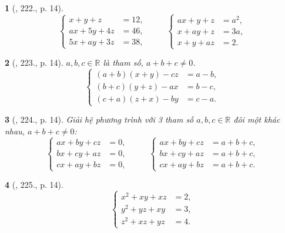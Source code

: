 \documentclass{article}
\newtheorem{baitoan}{}
\begin{document}
\begin{baitoan}[\cite{Binh_Toan_9_tap_2}, 222., p. 14]
	\begin{equation*}
		\left\{\begin{split}
			x + y + z &= 12,\\
			ax + 5y + 4z &= 46,\\
			5x + ay + 3z &= 38,
		\end{split}\right.\hspace{1cm}\left\{\begin{split}
			ax + y + z &= a^2,\\
			x + ay + z &= 3a,\\
			x + y + az &= 2.
		\end{split}\right.
	\end{equation*}
\end{baitoan}

\begin{baitoan}[\cite{Binh_Toan_9_tap_2}, 223., p. 14]
	$a,b,c\in\mathbb{R}$ là tham số, $a + b + c\ne0$.
	\begin{equation*}
		\left\{\begin{split}
			(a + b)(x + y) - cz &= a - b,\\
			(b + c)(y + z) - ax &= b - c,\\
			(c + a)(z + x) - by &= c - a.
		\end{split}\right.
	\end{equation*}
\end{baitoan}

\begin{baitoan}[\cite{Binh_Toan_9_tap_2}, 224., p. 14]
	Giải hệ phương trình với 3 tham số $a,b,c\in\mathbb{R}$ đôi một khác nhau, $a + b + c\ne0$:
	\begin{equation*}
		\left\{\begin{split}
			ax + by + cz &= 0,\\
			bx + cy + az &= 0,\\
			cx + ay + bz &= 0,
		\end{split}\right.\hspace{1cm}\left\{\begin{split}
			ax + by + cz &= a + b + c,\\
			bx + cy + az &= a + b + c,\\
			cx + ay + bz &= a + b + c.
		\end{split}\right.
	\end{equation*}
\end{baitoan}

\begin{baitoan}[\cite{Binh_Toan_9_tap_2}, 225., p. 14]
	\begin{equation*}
		\left\{\begin{split}
			x^2 + xy + xz &= 2,\\
			y^2 + yz + xy &= 3,\\
			z^2 + xz + yz &= 4.
		\end{split}\right.
	\end{equation*}
\end{baitoan}
\end{document}
